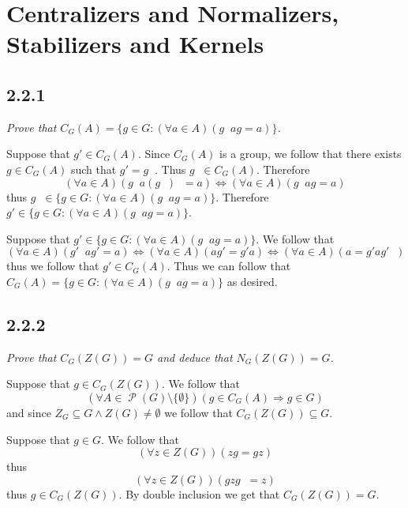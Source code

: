 \documentclass[11pt,oneside,titlepage]{book}
\DeclareMathOperator \pow {\mathcal {P}}
\DeclareMathOperator \inv {^{-1}}
\DeclareMathOperator \lra {\Leftrightarrow}
\DeclareMathOperator \ra {\Rightarrow}
\newcommand{\set}[1]{\{ #1 \}}
\begin{document}
\section{Centralizers and Normalizers, Stabilizers and Kernels}

\subsection*{2.2.1}

\textit{Prove that $C_G(A) = \set{g \in G: (\forall a \in A)(g \inv a g = a)}$.}

Suppose that $g' \in C_G(A)$. Since $C_G(A)$ is a group, we follow that there
exists $g \in C_G(A)$ such that $g' = g \inv$. Thus $g \inv \in C_G(A)$. Therefore
$$(\forall a \in A)(g \inv a (g\inv) \inv = a) \lra (\forall a \in A)(g \inv a g = a)$$
thus $g\inv \in \set{g \in G: (\forall a \in A)(g \inv a g = a)}$. Therefore
$g' \in \set{g \in G: (\forall a \in A)(g \inv a g = a)}$.

Suppose that $g' \in \set{g \in G: (\forall a \in A)(g \inv a g = a)}$.
We follow that
$$(\forall a \in A)(g' \inv a g' = a) \lra (\forall a \in A)( a g' = g' a) \lra
(\forall a \in A)( a  = g' a g'\inv)$$
thus we follow that $g' \in C_G(A)$. Thus we can follow that
$C_G(A) = \set{g \in G: (\forall a \in A)(g \inv a g = a)}$
as desired.


\subsection*{2.2.2}

\textit{Prove that $C_G(Z(G)) = G$ and deduce that $N_G(Z(G)) = G$.}

Suppose that $g \in C_G(Z(G))$. We follow that
$$(\forall A \in \pow(G) \setminus \set{\emptyset})(g \in C_G(A) \ra g \in G)$$
and since $Z_G \subseteq G \land Z(G) \neq \emptyset$ we follow that $C_G(Z(G)) \subseteq G$.

Suppose that $g \in G$. We follow that
$$(\forall z \in Z(G))(zg = gz)$$
thus
$$(\forall z \in Z(G))(g z g\inv = z)$$
thus $g \in C_G(Z(G))$. By double inclusion we get that $C_G(Z(G)) = G$. 
\end{document}
